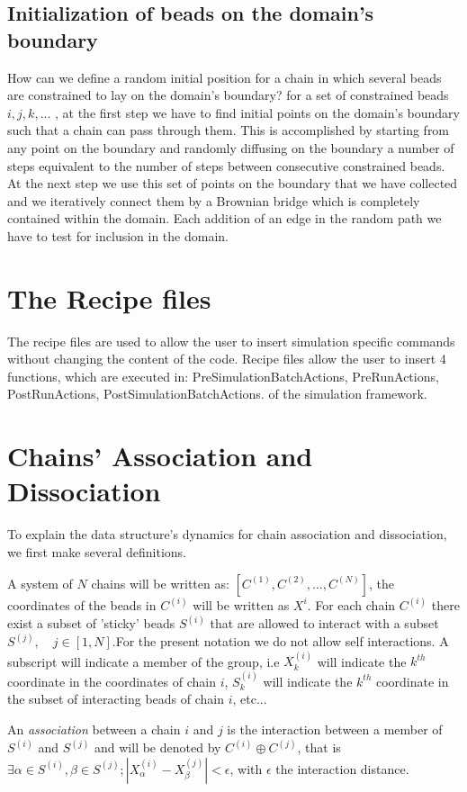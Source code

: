 \documentclass[12pt]{report}
\begin{document}
\subsection{Initialization of beads on the domain's boundary}
How can we define a random initial position for a chain in which several beads are constrained to lay on the domain's boundary? for a set of constrained beads $ i,j,k,...$ , at the first step we have to find initial points on the domain's boundary such that a chain can pass through them. This is accomplished by starting from any point on the boundary and randomly diffusing on the boundary a number of steps equivalent to the number of steps between consecutive constrained beads.  At the next step we use this set of points on the boundary that we have collected and we iteratively connect them by a Brownian bridge which is completely contained within the domain. Each addition of an edge in the random path we have to test for inclusion in the domain.


\section{The Recipe files}
The recipe files are used to allow the user to insert simulation specific commands without changing the content of the code. Recipe files allow the user to insert 4 functions, which are executed in: PreSimulationBatchActions, PreRunActions, PostRunActions, PostSimulationBatchActions. of the simulation framework. 

\section{Chains' Association and Dissociation} 
To explain the data structure's dynamics for chain association and dissociation, we first make several definitions.

A system of $N$ chains will be written as:  $[C^{(1)},C^{(2)},...,C^{(N)} ]$, the coordinates of the beads in $C^{(i)}$ will be written as $X^{i}$. For each chain $C^{(i)}$ there exist a subset of 'sticky' beads $S^{(i)}$ that are allowed to interact with a subset $S^{(j)},\quad j\in [1,N]$.For the present notation we do not allow self interactions. A subscript will indicate a member of the group, i.e $X^{(i)}_k$ will indicate the $k^{th}$ coordinate in the coordinates of chain $i$, $S^{(i)}_k$ will indicate the $k^{th}$ coordinate in the subset of interacting beads of chain $i$, etc... 

An \textit{association} between a chain $i$ and $j$ is the interaction between a member of $S^{(i)}$ and $S^{(j)}$ and will be denoted by  
$C^{(i)}\oplus C^{(j)}$, that is $\exists \alpha \in S^{(i)},\beta \in S^{(j)}; |X^{(i)}_\alpha-X^{(j)}_\beta |<\epsilon$, with $\epsilon$ the interaction distance.
\end{document}
